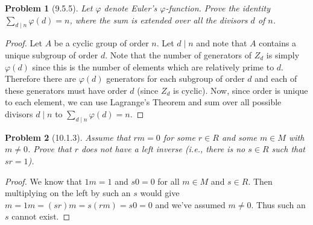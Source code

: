 \documentclass{article}
\newtheorem{problem}{Problem}
\begin{document}
\begin{problem}[9.5.5]
Let $\varphi$ denote Euler's $\varphi$-function. Prove the identity $\sum_{d \mid n} \varphi(d) = n$, where the sum is extended over all the divisors $d$ of $n$.
\end{problem}
\begin{proof}
Let $A$ be a cyclic group of order $n$. Let $d \mid n$ and note that $A$ contains a unique subgroup of order $d$. Note that the number of generators of $Z_d$ is simply $\varphi(d)$ since this is the number of elements which are relatively prime to $d$. Therefore there are $\varphi(d)$ generators for each subgroup of order $d$ and each of these generators must have order $d$ (since $Z_d$ is cyclic). Now, since order is unique to each element, we can use Lagrange's Theorem and sum over all possible divisors $d \mid n$ to $\sum_{d \mid n} \varphi(d) = n$.
\end{proof}

\begin{problem}[10.1.3]
Assume that $rm = 0$ for some $r \in R$ and some $m \in M$ with $m \neq 0$. Prove that $r$ does not have a left inverse (i.e., there is no $s \in R$ such that $sr = 1$).
\end{problem}
\begin{proof}
We know that $1m = 1$ and $s0 = 0$ for all $m \in M$ and $s \in R$. Then multiplying on the left by such an $s$ would give $m = 1m = (sr)m = s(rm) = s0 = 0$ and we've assumed $m \neq 0$. Thus such an $s$ cannot exist.
\end{proof}
\end{document}
